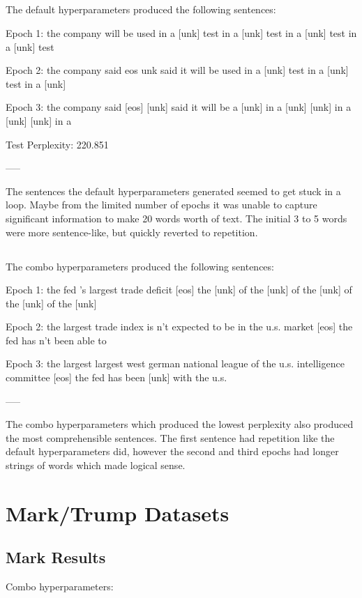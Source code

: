 \documentclass[10pt,a4paper]{article}
\begin{document}
\subsection{}

The default hyperparameters produced the following sentences:

Epoch 1: the company will be used in a [unk] test in a [unk] test in a [unk] test in a [unk] test

Epoch 2: the company said eos unk said it will be used in a [unk] test in a [unk] test in a [unk]

Epoch 3: the company said [eos] [unk] said it will be a [unk] in a [unk] [unk] in a [unk] [unk] in a

Test Perplexity: 220.851

-----

The sentences the default hyperparameters generated seemed to get stuck in a loop. Maybe from the limited number of epochs it was unable to capture significant information to make 20 words worth of text. The initial 3 to 5 words were more sentence-like, but quickly reverted to repetition.

\subsection{}

The combo hyperparameters produced the following sentences:

Epoch 1: the fed 's largest trade deficit [eos] the [unk] of the [unk] of the [unk] of the [unk] of the [unk]

Epoch 2: the largest trade index is n't expected to be in the u.s. market [eos] the fed has n't been able to

Epoch 3: the largest largest west german national league of the u.s. intelligence committee [eos] the fed has been [unk] with the u.s.

-----

The  combo hyperparameters which produced the lowest perplexity also produced the most comprehensible sentences. The first sentence had repetition like the default hyperparameters did, however the second and third epochs had longer strings of words which made logical sense.

\section{Mark/Trump Datasets}

\subsection{Mark Results}
Combo hyperparameters:
\end{document}
